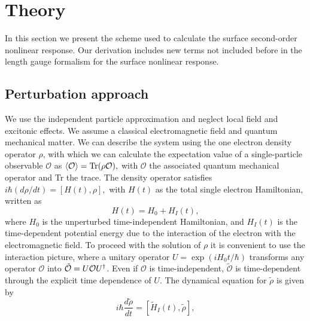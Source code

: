\documentclass[floatfix,prb,aps,superscriptaddress,11pt,preprint,letterpaper]{revtex4}
\def\chon{black}
\begin{document}
\section{Theory}

\label{theory}

In this section we present the scheme used to calculate the surface second-order
nonlinear response.
Our derivation includes new terms not included
before in the length gauge formalism for the surface nonlinear
response. 

\subsection{Perturbation approach}

We use the independent particle approximation and neglect local field
and excitonic effects{\color{\chon}. We assume a classical} electromagnetic field
{\color{\chon} and quantum mechanical matter.}
We can describe the system using 
the one electron density
operator ${\rho}$, with which we can calculate the expectation value of a
single-particle observable $\mathcal{O}$ as 
$\langle{\cal O}\rangle=\mbox{Tr}({\rho} {\cal O}),  
\label{calo}$
with $\mathcal{O}$ the associated quantum mechanical operator and Tr
the trace. 
The density operator satisfies
$
i\hbar (d{\rho}/dt)=[H(t),{\rho}],  
\label{rho}
$
with $H(t)$ as the total single electron Hamiltonian, written as 
\begin{equation*}
H(t)=H_{0}+H_{I}(t),  
\label{ache}
\end{equation*}
where $H_{0}$ is the unperturbed time-independent Hamiltonian, and $H_{I}(t)$
is the time-dependent potential energy due to the interaction of the
electron with the electromagnetic field.
To proceed with the solution of $\rho$  it is convenient to use the
interaction picture, where a unitary operator $U=\exp ({iH_{0}t/\hbar })$
transforms any operator $\mathcal{O}$ into 
$\tilde{\mathcal{O}}=U{\cal O}U^{\dagger }$. Even if $\mathcal{O}$ 
{\color{\chon} is time-independent}, 
$\tilde{\mathcal{O}}$ {\color{\chon} is time-dependent} through the explicit
time dependence of $U$. 
The dynamical 
equation for $\tilde{\rho}$ is 
given by
\begin{equation*}
i\hbar \frac{d\tilde{{\rho}}}{dt}=[\tilde{H}_{I}(t),\tilde{{\rho}}],  
\label{rho1}
\end{equation*}
\end{document}

